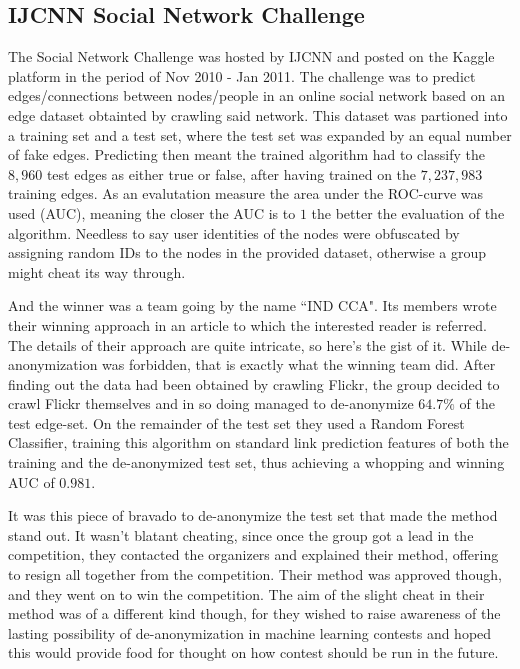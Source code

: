 \documentclass{llncs}
\begin{document}
\subsection{IJCNN Social Network Challenge}
The Social Network Challenge was hosted by IJCNN and posted on the Kaggle platform in the period of Nov 2010 - Jan 2011. The challenge was to predict edges/connections between nodes/people in an online social network based on an edge dataset obtainted by crawling said network. This dataset was partioned into a training set and a test set, where the test set was expanded by an equal number of fake edges. Predicting then meant the trained algorithm had to classify the $8,960$ test edges as either true or false, after having trained on the $7,237,983$ training edges. As an evalutation measure the area under the ROC-curve was used (AUC), meaning the closer the AUC is to $1$ the better the evaluation of the algorithm. Needless to say user identities of the nodes were obfuscated by assigning random IDs to the nodes in the provided dataset, otherwise a group might cheat its way through.

And the winner was a team going by the name ``IND CCA". Its members wrote their winning approach in an article \cite{6033446} to which the interested reader is referred. The details of their approach are quite intricate, so here's the gist of it. While de-anonymization was forbidden, that is exactly what the winning team did. After finding out the data had been obtained by crawling Flickr, the group decided to crawl Flickr themselves and in so doing managed to de-anonymize $64.7 \%$ of the test edge-set. On the remainder of the test set they used a Random Forest Classifier, training this algorithm on standard link prediction features of both the training and the de-anonymized test set, thus achieving a whopping and winning AUC of $0.981$.

It was this piece of bravado to de-anonymize the test set that made the method stand out. It wasn't blatant cheating, since once the group got a lead in the competition, they contacted the organizers and explained their method, offering to resign all together from the competition. Their method was approved though, and they went on to win the competition. The aim of the slight cheat in their method was of a different kind though, for they wished to raise awareness of the lasting possibility of de-anonymization in machine learning contests and hoped this would provide food for thought on how contest should be run in the future.
\end{document}
